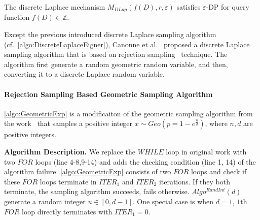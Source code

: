     \begin{theorem}
        The discrete Laplace mechanism $M_{DLap}\left(f\left(D\right),r,\varepsilon\right)$ satisfies $\varepsilon$-DP for query function $f\left(D\right)\in\mathbb{Z} $.
    \end{theorem}

    Except the previous introduced discrete Laplace sampling algorithm (cf.~\autoref{algo:DiscreteLaplaceEigner}), Canonne et al.~\cite{canonne2020discrete} proposed a discrete Laplace sampling algorithm that is based on rejection sampling~\cite{casella2004generalized} technique. The algorithm first generate a random geometric random variable, and then, converting it to a discrete Laplace random variable.






    \paragraph{Rejection Sampling Based Geometric Sampling Algorithm}
    \label{para:RejectionSamplingBasedGeometricSamplingAlgorithm}

    \autoref{algo:GeometricExp} is a modificaiton of the geometric sampling algorithm from the work~\cite{canonne2020discrete} that samples a positive integer $x\sim Geo\left( p=1-e^{\frac{n}{d}}\right)$, where $n,d$ are positive integers.

    \textbf{Algorithm Description. }
    We replace the $WHILE$ loop in original work with two $FOR$ loops (line 4-8,9-14) and adds the checking condition (line 1, 14) of the algorithm failure.
    \autoref{algo:GeometricExp} consists of two $FOR$ loops and check if these $FOR$ loops terminate in $ITER_1$ and $ITER_2$ iterations. If they both terminate, the sampling algorithm succeeds, fails otherwise.
$Algo^{RandInt}\left(d\right) $ generate a random integer $u\in \left[0,d-1\right] $.
    One special case is when $d=1$, $1$th $FOR$ loop directly terminates with $ITER_1=0$.

